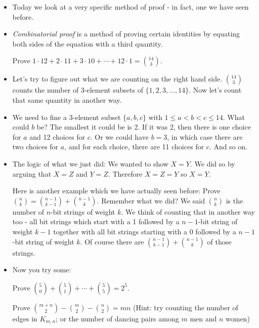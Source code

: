 \begin{itemize}
  \item Today we look at a very specific method of proof - in fact, one we have seen before.
  \item {\em Combinatorial proof} is a method of proving certain identities by equating both sides of the equation with a third quantity.
  
  \ex Prove $1\cdot 12 + 2\cdot 11 + 3\cdot 10 + \cdots + 12 \cdot 1 = {14 \choose 3}$.
  
  \item Let's try to figure out what we are counting on the right hand side.  ${14 \choose 3}$ counts the number of 3-element subsets of $\{1,2,3,\ldots,14\}$. Now let's count that same quantity in another way.
  
  \item We need to fine a 3-element subset $\{a,b,c\}$ with $1 \le a < b < c \le 14$.  What could $b$ be?  The smallest it could be is 2.  If it was 2, then there is one choice for $a$ and 12 choices for $c$.  Or we could have $b = 3$, in which case there are two choices for $a$, and for each choice, there are 11 choices for $c$.  And so on.  
  
  \item The logic of what we just did: We wanted to show $X = Y$.  We did so by arguing that $X = Z$ and $Y = Z$.  Therefore $X = Z = Y$ so $X = Y$.
  
  \ex Here is another example which we have actually seen before: Prove ${n \choose k} = {n-1 \choose k-1} + {n-1 \choose k}$.  Remember what we did?  We said ${n \choose k}$ is the number of $n$-bit strings of weight $k$.  We think of counting that in another way too - all bit strings which start with a 1 followed by a $n-1$-bit string of weight $k-1$ together with all bit strings starting with a 0 followed by a $n-1$-bit string of weight $k$.  Of course there are ${n-1\choose k-1} + {n-1 \choose k}$ of those strings.
  
  \item Now you try some:
  
  \ex Prove ${5 \choose 0} + {5 \choose 1} + \cdots + {5\choose 5} = 2^5$.
  
  \ex Prove ${m+n \choose 2} - {m \choose 2} - {n \choose 2} = mn$  (Hint: try counting the number of edges in $K_{m,n}$; or the number of dancing pairs among $m$ men and $n$ women)
\end{itemize}



